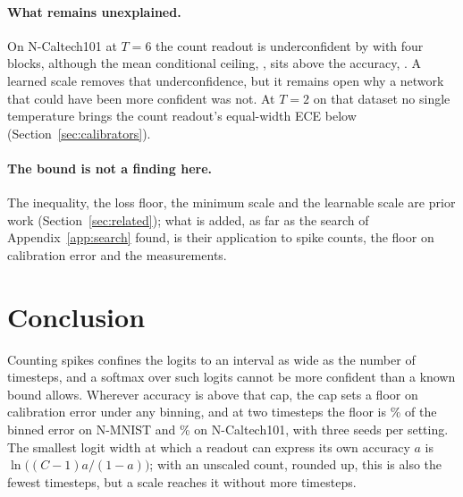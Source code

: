 \documentclass[10pt]{article}
\begin{document}
\paragraph{What remains unexplained.} On N-Caltech101 at $T=6$ the count readout is underconfident
by \residNcFourSix{} with four blocks, although the mean conditional ceiling, %
\condCeilHundredOneSix, sits above the accuracy, \accHundredOneSix. A learned scale removes that %
underconfidence, but it remains open why a network that could have been more confident was not. At $T=2$
on that dataset no single temperature brings the count readout's equal-width ECE below %
\scanNcTwoLowW{} (Section~\ref{sec:calibrators}).

\paragraph{The bound is not a finding here.} The inequality, the loss floor, the minimum scale and
the learnable scale are prior work (Section~\ref{sec:related}); what is added, as far as the search
of Appendix~\ref{app:search} found, is their application to spike counts, the floor on
calibration error and the measurements.


\section{Conclusion}
\label{sec:conclusion}

Counting spikes confines the logits to an interval as wide as the number of timesteps, and a
softmax over such logits cannot be more confident than a known bound allows. Wherever accuracy is
above that cap, the cap sets a floor on calibration error under any binning, and at two timesteps
the floor is \frNmTwoInt\% of the binned error on N-MNIST and \frNcTwoInt\% on N-Caltech101, %
with three seeds per setting. The smallest logit width at which a readout can express its own
accuracy $a$ is $\ln\big((C-1)a/(1-a)\big)$; with an unscaled count, rounded up, this is also the
fewest timesteps, but a scale reaches it without more timesteps.
\end{document}
